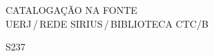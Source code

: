 \begin{titlepage}
	\begin{center}
\vfill
\singlespacing
	\vspace*{85mm}
	{CATALOGAÇÃO NA FONTE\\ \vspace{1.5mm}
	UERJ\,/\,REDE SIRIUS\,/\,BIBLIOTECA CTC/B}\\
	\vspace{1.5mm}
	\begin{boxedminipage}{140mm}
	\begin{minipage}{5mm}
		\vspace{-80mm}
		S237
	\end{minipage}
	\hfill
	\raisebox{8.5mm}{
	\begin{minipage}[top]{115mm}
		\vspace*{5mm}


\end{minipage}}
\end{boxedminipage}
\end{center}
\end{titlepage}
